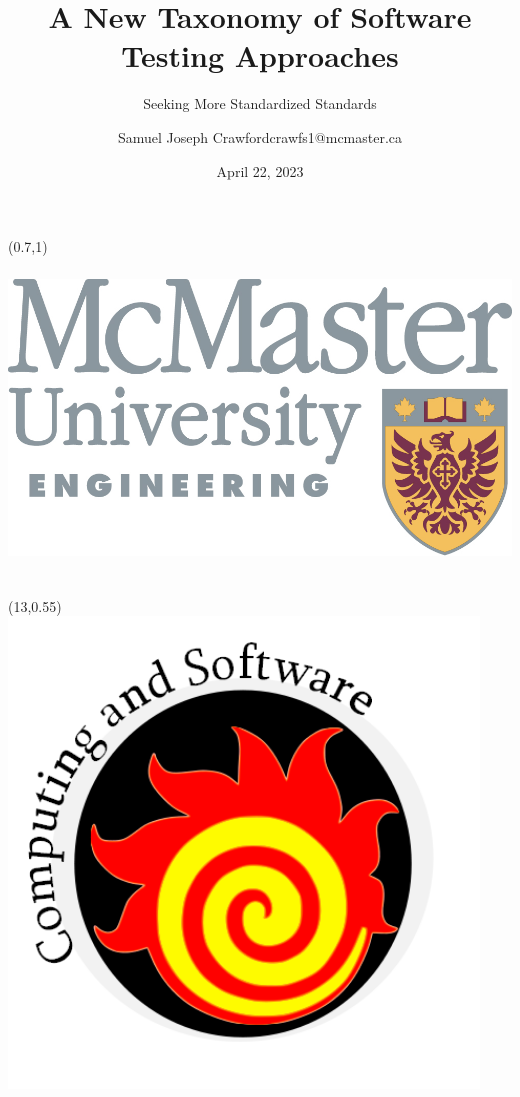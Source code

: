 \documentclass[22pt]{beamer}
\title{A New Taxonomy of Software Testing Approaches}
\subtitle{Seeking More Standardized Standards}
\author[Crawford]{Samuel Joseph Crawford\newline \small crawfs1@mcmaster.ca} %
\institute[McMaster University]{Department of Computing and Software, McMaster University} %
\date{April 22, 2023}
\begin{document}

\begin{frame}[fragile]

    \begin{textblock}{2}(0.7,1)
        \includegraphics[height=8.5cm]{eng_logo.png}
    \end{textblock}

    \begin{textblock}{2}(13,0.55)
        \includegraphics[height=12.5cm]{cas_logo.png}
    \end{textblock}


\end{frame}
\end{document}
